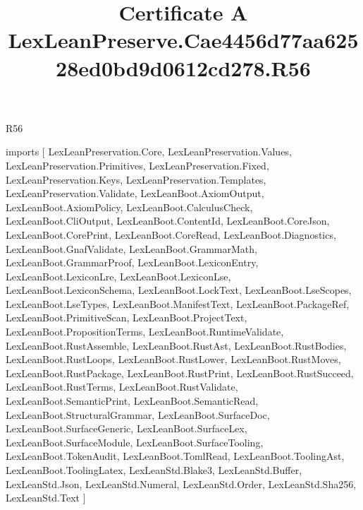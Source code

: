 \begin{lexlean}{R56}
\title{Certificate A LexLeanPreserve.Cae4456d77aa62528ed0bd9d0612cd278.R56}
\begin{coremodule}
imports [
  LexLeanPreservation.Core,
  LexLeanPreservation.Values,
  LexLeanPreservation.Primitives,
  LexLeanPreservation.Fixed,
  LexLeanPreservation.Keys,
  LexLeanPreservation.Templates,
  LexLeanPreservation.Validate,
  LexLeanBoot.AxiomOutput,
  LexLeanBoot.AxiomPolicy,
  LexLeanBoot.CalculusCheck,
  LexLeanBoot.CliOutput,
  LexLeanBoot.ContentId,
  LexLeanBoot.CoreJson,
  LexLeanBoot.CorePrint,
  LexLeanBoot.CoreRead,
  LexLeanBoot.Diagnostics,
  LexLeanBoot.GnafValidate,
  LexLeanBoot.GrammarMath,
  LexLeanBoot.GrammarProof,
  LexLeanBoot.LexiconEntry,
  LexLeanBoot.LexiconLre,
  LexLeanBoot.LexiconLse,
  LexLeanBoot.LexiconSchema,
  LexLeanBoot.LockText,
  LexLeanBoot.LseScopes,
  LexLeanBoot.LseTypes,
  LexLeanBoot.ManifestText,
  LexLeanBoot.PackageRef,
  LexLeanBoot.PrimitiveScan,
  LexLeanBoot.ProjectText,
  LexLeanBoot.PropositionTerms,
  LexLeanBoot.RuntimeValidate,
  LexLeanBoot.RustAssemble,
  LexLeanBoot.RustAst,
  LexLeanBoot.RustBodies,
  LexLeanBoot.RustLoops,
  LexLeanBoot.RustLower,
  LexLeanBoot.RustMoves,
  LexLeanBoot.RustPackage,
  LexLeanBoot.RustPrint,
  LexLeanBoot.RustSucceed,
  LexLeanBoot.RustTerms,
  LexLeanBoot.RustValidate,
  LexLeanBoot.SemanticPrint,
  LexLeanBoot.SemanticRead,
  LexLeanBoot.StructuralGrammar,
  LexLeanBoot.SurfaceDoc,
  LexLeanBoot.SurfaceGeneric,
  LexLeanBoot.SurfaceLex,
  LexLeanBoot.SurfaceModule,
  LexLeanBoot.SurfaceTooling,
  LexLeanBoot.TokenAudit,
  LexLeanBoot.TomlRead,
  LexLeanBoot.ToolingAst,
  LexLeanBoot.ToolingLatex,
  LexLeanStd.Blake3,
  LexLeanStd.Buffer,
  LexLeanStd.Json,
  LexLeanStd.Numeral,
  LexLeanStd.Order,
  LexLeanStd.Sha256,
  LexLeanStd.Text
]


\end{coremodule}
\end{lexlean}
